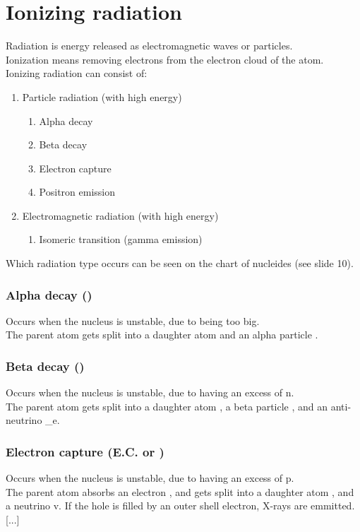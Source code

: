 \section{Ionizing radiation}
Radiation is energy released as electromagnetic waves or particles. \\
Ionization means removing electrons from the electron cloud of the atom. \\
Ionizing radiation can consist of:
 \begin{enumerate}
	\item Particle radiation (with high energy)
	 \begin{enumerate}
		\item Alpha decay
		\item Beta decay
		\item Electron capture
		\item Positron emission
	\end{enumerate}
	 \item Electromagnetic radiation (with high energy)
	 \begin{enumerate}
		\item Isomeric transition (gamma emission)
	\end{enumerate}	 
\end{enumerate}
Which radiation type occurs can be seen on the chart of nucleides (see slide 10). 
\subsubsection{Alpha decay (\alpha)}
Occurs when the nucleus is unstable, due to being too big.\\
The parent atom  gets split into a daughter atom  and an alpha particle .
\subsubsection{Beta decay (\beta)}
Occurs when the nucleus is unstable, due to having an excess of n.\\
The parent atom  gets split into a daughter atom , a beta particle , and an anti-neutrino _e.
\subsubsection{Electron capture (E.C. or \epsilon)}
Occurs when the nucleus is unstable, due to having an excess of p.\\
The parent atom  absorbs an electron , and gets split into a daughter atom , and a neutrino v.
If the hole is filled by an outer shell electron, X-rays are emmitted.
[...]
